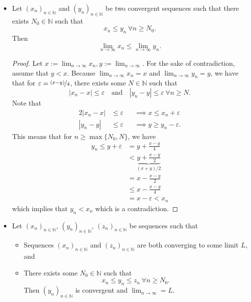 \documentclass{article}
\newcommand{\N}{\mathbb{N}}
\newcommand{\seq}[2]{(#1_{#2})_{#2 \in \N}}
\newcommand{\mylim}[2]{\lim_{#1 \to #2}}
\newcommand{\?}{\stackrel{?}{=}}
\newcommand{\smallblacksquare}{\rule{0.5em}{0.5em}}
\theoremstyle{definition} %
\begin{document}
\begin{itemize}
    \item[]
    \begin{lemma}
        Let $\seq{x}{n}$ and $\seq{y}{n}$ be two convergent sequences such that there exists $N_0 \in \N$ such that
    $$x_n \leq y_n \ \forall n \geq N_0.$$
    Then
    $$\lim\limits_{n \to \infty} x_n \leq \lim\limits_{n \to \infty} y_n.$$
    \end{lemma}
    \begin{proof}
        Let $x := \mylim{n}{\infty} x_n, y := \mylim{n}{\infty}$. For the sake of contradiction, assume that $y < x$. Because $\mylim{n}{\infty} x_n = x$ and $\mylim{n}{\infty} y_n = y$, we have that for $\varepsilon = \nicefrac{(x - y)}{4}$, there exists some $N \in \N$ such that
        $$|x_n - x| \leq \varepsilon \quad \text{and} \quad |y_n - y| \leq \varepsilon \ \forall n \geq N.$$
        Note that
        \begin{alignat*}{2}
            |x_n - x| &\leq \varepsilon &&\implies x \leq x_n + \varepsilon \\
            |y_n - y| &\leq\varepsilon && \implies y \geq y_n - \varepsilon.
        \end{alignat*}
        This means that for $n \geq \max\{N_0, N\}$, we have
        \begin{align*}
            y_n \leq y + \varepsilon &= y + \frac{x - y}{4} \\
            &< \underbrace{y + \frac{x - y}{2}}_{(x + y)/2} \\
            &= x - \frac{x - y}{2} \\
            &\leq x - \frac{x - y}{4} \\
            &= x - \varepsilon < x_n
        \end{align*}
        which implies that $y_n < x_n$ which is a contradiction.
    \end{proof}
    \item[]
    \begin{theorem}
        Let $\seq{x}{n}$, $\seq{y}{n}$, $\seq{z}{n}$ be sequences such that
    \begin{itemize}[label=\smallblacksquare]
        \item Sequences $\seq{x}{n}$ and $\seq{z}{n}$ are both converging to some limit $L$, and
        \item There exists some $N_0 \in \N$ such that
        $$x_n \leq y_n \leq z_n \ \forall n \geq N_0.$$
        Then $\seq{y}{n}$ is convergent and $\mylim{n}{\infty} = L$.

\end{itemize}
\end{theorem}
\end{itemize}
\end{document}

